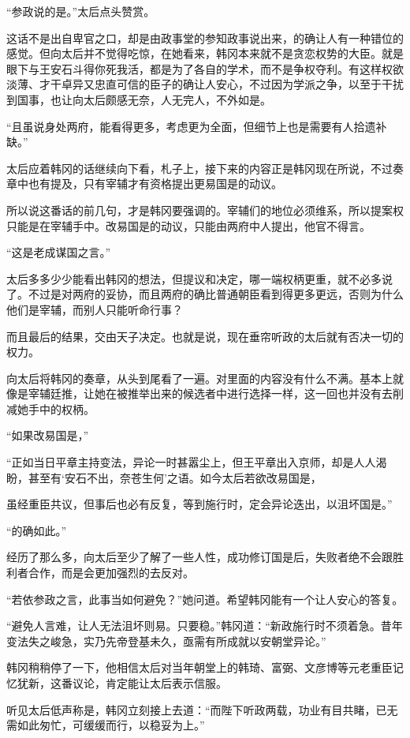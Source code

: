 “参政说的是。”太后点头赞赏。

这话不是出自卑官之口，却是由政事堂的参知政事说出来，的确让人有一种错位的感觉。但向太后并不觉得吃惊，在她看来，韩冈本来就不是贪恋权势的大臣。就是眼下与王安石斗得你死我活，都是为了各自的学术，而不是争权夺利。有这样权欲淡薄、才干卓异又忠直可信的臣子的确让人安心，不过因为学派之争，以至于干扰到国事，也让向太后颇感无奈，人无完人，不外如是。

“且虽说身处两府，能看得更多，考虑更为全面，但细节上也是需要有人拾遗补缺。”

太后应着韩冈的话继续向下看，札子上，接下来的内容正是韩冈现在所说，不过奏章中也有提及，只有宰辅才有资格提出更易国是的动议。

所以说这番话的前几句，才是韩冈要强调的。宰辅们的地位必须维系，所以提案权只能是在宰辅手中。改易国是的动议，只能由两府中人提出，他官不得言。

“这是老成谋国之言。”

太后多多少少能看出韩冈的想法，但提议和决定，哪一端权柄更重，就不必多说了。不过是对两府的妥协，而且两府的确比普通朝臣看到得更多更远，否则为什么他们是宰辅，而别人只能听命行事？

而且最后的结果，交由天子决定。也就是说，现在垂帘听政的太后就有否决一切的权力。

向太后将韩冈的奏章，从头到尾看了一遍。对里面的内容没有什么不满。基本上就像是宰辅廷推，让她在被推举出来的候选者中进行选择一样，这一回也并没有去削减她手中的权柄。

“如果改易国是，”

“正如当日平章主持变法，异论一时甚嚣尘上，但王平章出入京师，却是人人渴盼，甚至有‘安石不出，奈苍生何’之语。如今太后若欲改易国是，

虽经重臣共议，但事后也必有反复，等到施行时，定会异论迭出，以沮坏国是。”

“的确如此。”

经历了那么多，向太后至少了解了一些人性，成功修订国是后，失败者绝不会跟胜利者合作，而是会更加强烈的去反对。

“若依参政之言，此事当如何避免？”她问道。希望韩冈能有一个让人安心的答复。

“避免人言难，让人无法沮坏则易。只要稳。”韩冈道：“新政施行时不须着急。昔年变法失之峻急，实乃先帝登基未久，亟需有所成就以安朝堂异论。”

韩冈稍稍停了一下，他相信太后对当年朝堂上的韩琦、富弼、文彦博等元老重臣记忆犹新，这番议论，肯定能让太后表示信服。

听见太后低声称是，韩冈立刻接上去道：“而陛下听政两载，功业有目共睹，已无需如此匆忙，可缓缓而行，以稳妥为上。”

